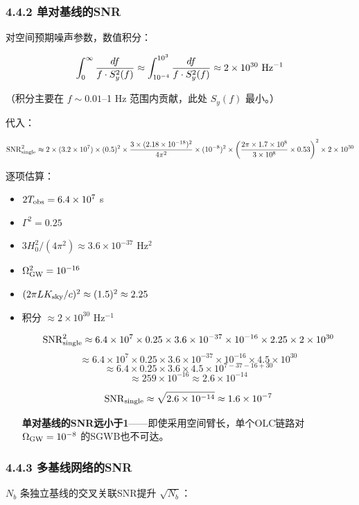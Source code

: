 \documentclass[12pt,a4paper]{article}
\begin{document}
\subsubsection{4.4.2 单对基线的SNR}


对空间预期噪声参数，数值积分：

$$\int_0^\infty \frac{df}{f \cdot S_y^2(f)} \approx \int_{10^{-4}}^{10^3} \frac{df}{f \cdot S_y^2(f)} \approx 2 \times 10^{30} \ {\rm Hz^{-1}}$$

（积分主要在 $f \sim 0.01$–1 Hz 范围内贡献，此处 $S_y(f)$ 最小。）

代入：

$${\rm SNR}_{\rm single}^2 \approx 2 \times (3.2 \times 10^7) \times (0.5)^2 \times \frac{3 \times (2.18 \times 10^{-18})^2}{4\pi^2} \times (10^{-8})^2 \times \left(\frac{2\pi \times 1.7 \times 10^8}{3 \times 10^8} \times 0.53\right)^2 \times 2 \times 10^{30}$$

逐项估算：
\begin{itemize}
  \item $2T_{\rm obs} = 6.4 \times 10^7$ s
  \item $\Gamma^2 = 0.25$
  \item $3H_0^2/(4\pi^2) \approx 3.6 \times 10^{-37}$ Hz$^2$
  \item $\Omega_{\rm GW}^2 = 10^{-16}$
  \item $(2\pi L K_{\rm sky}/c)^2 \approx (1.5)^2 \approx 2.25$
  \item 积分 $\approx 2 \times 10^{30}$ Hz$^{-1}$

$${\rm SNR}_{\rm single}^2 \approx 6.4 \times 10^7 \times 0.25 \times 3.6 \times 10^{-37} \times 10^{-16} \times 2.25 \times 2 \times 10^{30}$$
$$\approx 6.4 \times 10^7 \times 0.25 \times 3.6 \times 10^{-37} \times 10^{-16} \times 4.5 \times 10^{30}$$
$$\approx 6.4 \times 0.25 \times 3.6 \times 4.5 \times 10^{7-37-16+30}$$
$$\approx 259 \times 10^{-16} \approx 2.6 \times 10^{-14}$$

$${\rm SNR}_{\rm single} \approx \sqrt{2.6 \times 10^{-14}} \approx 1.6 \times 10^{-7}$$

\textbf{单对基线的SNR远小于1}——即使采用空间臂长，单个OLC链路对 $\Omega_{\rm GW} = 10^{-8}$ 的SGWB也不可达。

\end{itemize}
\subsubsection{4.4.3 多基线网络的SNR}


$N_b$ 条独立基线的交叉关联SNR提升 $\sqrt{N_b}$：
\end{document}
